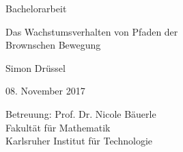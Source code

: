 \documentclass[12pt,a4paper]{scrartcl}
\numberwithin{equation}{section}
\numberwithin{equation}{section}%
\theoremstyle{definition}
\begin{document}
  \pagestyle{empty}

\begin{titlepage}

    \vspace*{2cm} 
\begin{center} \large 
    
    Bachelorarbeit
    \vspace*{2cm}

    {\huge Das Wachstumsverhalten von Pfaden der}\\
    \vspace*{10pt}
    {\huge Brownschen Bewegung}
    \vspace*{2.5cm}

    Simon Drüssel
    \vspace*{1.5cm}

    08. November 2017
    \vspace*{3.5cm}


    Betreuung: Prof. Dr. Nicole Bäuerle \\[1cm]
    Fakultät für Mathematik \\[1cm]
		Karlsruher Institut für Technologie
\end{center}
\end{titlepage}

\ \\
\newpage

\tableofcontents %

\newpage
\phantom \\
\newpage

  \pagestyle{headings}

\setcounter{page}{1}
\end{document}
